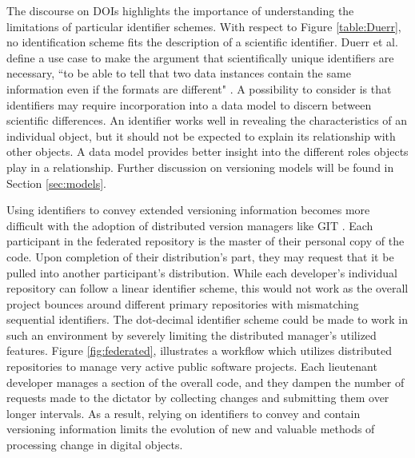The discourse on DOIs highlights the importance of understanding the limitations of particular identifier schemes.
With respect to Figure \ref{table:Duerr}, no identification scheme fits the description of a scientific identifier.
Duerr et al. define a use case to make the argument that scientifically unique identifiers are necessary, ``to be able to tell that two data instances contain the same information even if the formats are different" \cite{Duerr2011}.
A possibility to consider is that identifiers may require incorporation into a data model to discern between scientific differences.
An identifier works well in revealing the characteristics of an individual object, but it should not be expected to explain its relationship with other objects.
A data model provides better insight into the different roles objects play in a relationship.
Further discussion on versioning models will be found in Section \ref{sec:models}.

Using identifiers to convey extended versioning information becomes more difficult with the adoption of distributed version managers like GIT \cite{cederqvist2002version}.
Each participant in the federated repository is the master of their personal copy of the code.
Upon completion of their distribution's part, they may request that it be pulled into another participant's distribution.
While each developer's individual repository can follow a linear identifier scheme, this would not work as the overall project bounces around different primary repositories with mismatching sequential identifiers.
The dot-decimal identifier scheme could be made to work in such an environment by severely limiting the distributed manager's utilized features.
Figure \ref{fig:federated}, illustrates a workflow which utilizes distributed repositories to manage very active public software projects.
Each lieutenant developer manages a section of the overall code, and they dampen the number of requests made to the dictator by collecting changes and submitting them over longer intervals.
As a result, relying on identifiers to convey and contain versioning information limits the evolution of new and valuable methods of processing change in digital objects.

